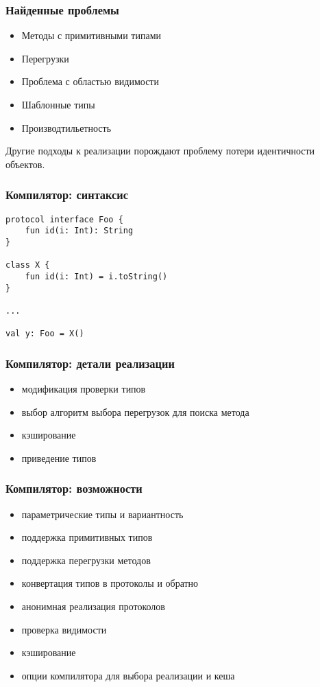 \documentclass{beamer}
\begin{document}
\begin{frame}\frametitle{Найденные проблемы}
\begin{itemize}
    \item Методы с примитивными типами
    \item Перегрузки
    \item Проблема с областью видимости
    \item Шаблонные типы
    \item Производтильетность
\end{itemize}
Другие подходы к реализации порождают проблему потери идентичности объектов.
\end{frame}

\lstset{language=kotlin}
\begin{frame}[fragile]\frametitle{Компилятор: синтаксис}
\begin{lstlisting}
protocol interface Foo {
    fun id(i: Int): String
}

class X {
    fun id(i: Int) = i.toString()
}

...

val y: Foo = X()
\end{lstlisting}
\end{frame}

\begin{frame}\frametitle{Компилятор: детали реализации}
\begin{itemize}
    \item модификация проверки типов
    \item выбор алгоритм выбора перегрузок для поиска метода
    \item кэширование
    \item приведение типов
\end{itemize}
\end{frame}

\begin{frame}\frametitle{Компилятор: возможности}
\begin{itemize}
    \item параметрические типы и вариантность
    \item поддержка примитивных типов
    \item поддержка перегрузки методов
    \item конвертация типов в протоколы и обратно
    \item анонимная реализация протоколов
    \item проверка видимости
    \item кэширование
    \item опции компилятора для выбора реализации и кеша
\end{itemize}
\end{frame}
\end{document}
